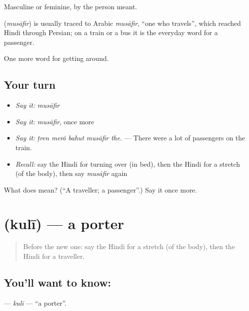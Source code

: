 Masculine or feminine, by the person meant.

\begin{cousinweb}
\textbf{} (\emph{musāfir}) is usually traced to Arabic \emph{musāfir}, \textquotedblleft{}one who travels\textquotedblright{}, which reached Hindi through Persian; on a train or a bus it is the everyday word for a passenger.
\end{cousinweb}

\begin{grammarlens}[title={What you've built}]
One more word for getting around.
\end{grammarlens}

\subsection*{Your turn}
\begin{itemize}
\raggedright
  \item \emph{Say it:} \emph{musāfir}
  \item \emph{Say it:} \emph{musāfir}, once more
  \item \emph{Say it:} \emph{ṭren meṁ bahut musāfir the.} — There were a lot of passengers on the train.
  \item \emph{Recall:} say the Hindi for turning over (in bed), then the Hindi for a stretch (of the body), then say \emph{musāfir} again
\end{itemize}

\begin{tcolorbox}[breakable,colback=teal!4,colframe=teal!35!black,title={Before you move on}]
What does  mean? (\textquotedblleft{}A traveller; a passenger\textquotedblright{}.) Say it once more.
\end{tcolorbox}
\section[\texorpdfstring{\hi{कुली} (kulī)}{कुली (kulī)}]{ (kulī) — a porter}

\label{lesson:HI-C398-kuli}



\begin{quote}
Before the new one: say the Hindi for a stretch (of the body), then the Hindi for a traveller.
\end{quote}

\subsection*{You'll want to know: }
\textbf{} — \emph{kulī} — \textquotedblleft{}a porter\textquotedblright{}.


